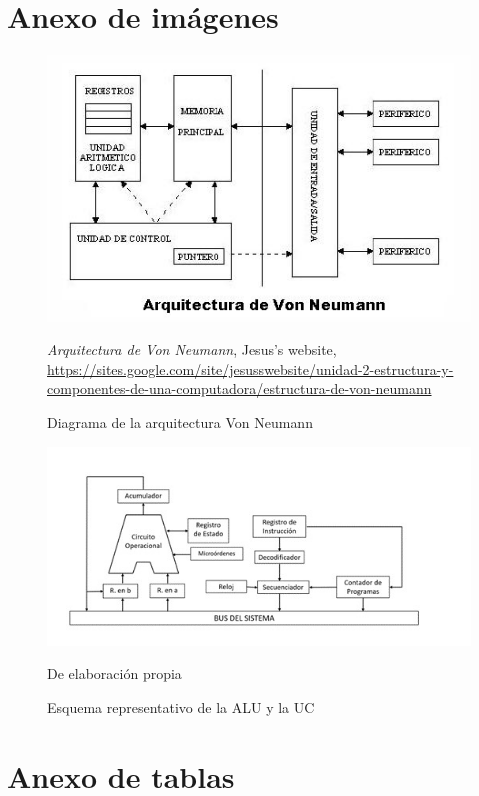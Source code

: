 \documentclass{book}
\begin{document}
\chapter{Anexo de imágenes}

\begin{figure}[H]
    \centering
    \includegraphics[width=1\textwidth]{figures/Von_Neumann.png}
    \caption{ \Centering Diagrama  de la arquitectura Von Neumann} 
    
    \textit{Arquitectura de Von Neumann}, Jesus's website, \url{https://sites.google.com/site/jesusswebsite/unidad-2-estructura-y-componentes-de-una-computadora/estructura-de-von-neumann}
    \label{fig:arq_vn}
\end{figure}


\begin{figure}[H]
    \centering
    \includegraphics[width=1\textwidth]{figures/ALU .jpg}
    \caption{ Esquema representativo de la ALU y la UC}
    
    De elaboración propia
    \label{fig:ALU}
\end{figure}


\chapter{Anexo de tablas}
\end{document}
